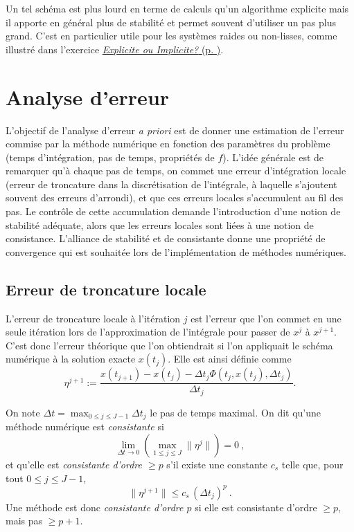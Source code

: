 Un tel schéma est plus lourd en terme de calculs qu'un algorithme
explicite mais il apporte en général plus de stabilité et permet souvent
d'utiliser un pas plus grand. C'est en particulier utile pour les
systèmes raides ou non-lisses, comme illustré dans l'exercice
\protect\hyperlink{ed2-exo_exp_impl}{\emph{Explicite ou Implicite?} (p.
\pageref*{ed2-exo_exp_impl})}.

\hypertarget{ed2-analyse-derreur}{%
\chapter{Analyse d'erreur}\label{ed2-analyse-derreur}}

L'objectif de l'analyse d'erreur \emph{a priori} est de donner une
estimation de l'erreur commise par la méthode numérique en fonction des
paramètres du problème (temps d'intégration, pas de temps, propriétés de
\(f\)). L'idée générale est de remarquer qu'à chaque pas de temps, on
commet une erreur d'intégration locale (erreur de troncature dans la
discrétisation de l'intégrale, à laquelle s'ajoutent souvent des erreurs
d'arrondi), et que ces erreurs locales s'accumulent au fil des pas. Le
contrôle de cette accumulation demande l'introduction d'une notion de
stabilité adéquate, alors que les erreurs locales sont liées à une
notion de consistance. L'alliance de stabilité et de consistante donne
une propriété de convergence qui est souhaitée lors de l'implémentation
de méthodes numériques.

\hypertarget{ed2-erreur-de-troncature-locale}{%
\section{Erreur de troncature
locale}\label{ed2-erreur-de-troncature-locale}}

L'erreur de troncature locale à l'itération \(j\) est l'erreur que l'on
commet en une seule itération lors de l'approximation de l'intégrale
pour passer de \(x^j\) à \(x^{j+1}\). C'est donc l'erreur théorique que
l'on obtiendrait si l'on appliquait le schéma numérique à la solution
exacte \(x(t_j)\). Elle est ainsi définie comme \[
\eta^{j+1} := \frac{x(t_{j+1}) - x(t_j) - {\Delta t}_j \Phi(t_j,x(t_j),{\Delta t}_j)}{{\Delta t}_j}.
\]

\hypertarget{ed2-def_consistance}{}
\begin{definition}[Consistance]\label{ed2-def_consistance}
On note \({\Delta t}= \max_{0\le j\le J-1} {\Delta t}_j\) le pas de
temps maximal. On dit qu'une méthode numérique est \emph{consistante} si
\[
\lim_{{\Delta t}\to 0} \left( \max_{1\le j\le J} \|\eta^{j}\| \right) = 0 \ ,
\] et qu'elle est \emph{consistante d'ordre \(\geq p\)} s'il existe une
constante \(c_s\) telle que, pour tout \(0\le j\le J-1\), \[
\|\eta^{j+1}\| \le c_s \, ({\Delta t}_j)^{p} \ .
\] Une méthode est donc \emph{consistante d'ordre \(p\)} si elle est
consistante d'ordre \(\geq p\), mais pas \(\geq p+1\).
\end{definition}

